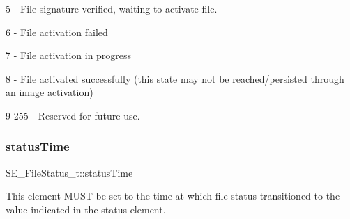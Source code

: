 5 -\/ File signature verified, waiting to activate file.

6 -\/ File activation failed

7 -\/ File activation in progress

8 -\/ File activated successfully (this state may not be reached/persisted through an image activation)

9-\/255 -\/ Reserved for future use. \mbox{\label{group__FileStatus_ga07bc76971f8a0f26f8e5b1c62e6432e6}} 
\subsubsection{\texorpdfstring{status\+Time}{statusTime}}
{\footnotesize\ttfamily S\+E\+\_\+\+File\+Status\+\_\+t\+::status\+Time}

This element M\+U\+ST be set to the time at which file status transitioned to the value indicated in the status element. 